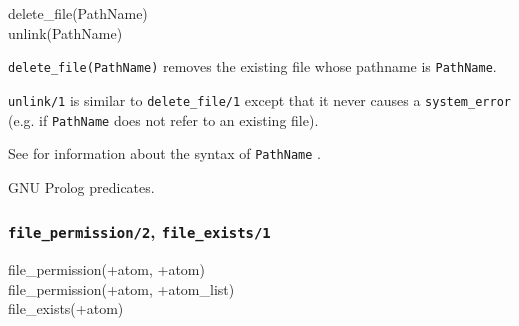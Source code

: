 \begin{TemplatesOneCol}
delete\_file(PathName)\\
unlink(PathName)

\end{TemplatesOneCol}

\Description

\texttt{delete\_file(PathName)} removes the existing file whose pathname is
\texttt{PathName}.

\texttt{unlink/1} is similar to \texttt{delete\_file/1} except that it never
causes a \texttt{system\_error} (e.g. if \texttt{PathName} does not refer to
an existing file).

See  for information about the syntax of
\texttt{PathName} .

\begin{PlErrors}





\end{PlErrors}

\Portability

GNU Prolog predicates.

\subsubsection{\texttt{file\_permission/2},
               \texttt{file\_exists/1}}
\label{file-permission/2}

\begin{TemplatesOneCol}
file\_permission(+atom, +atom)\\
file\_permission(+atom, +atom\_list)\\
file\_exists(+atom)

\end{TemplatesOneCol}

\Description

